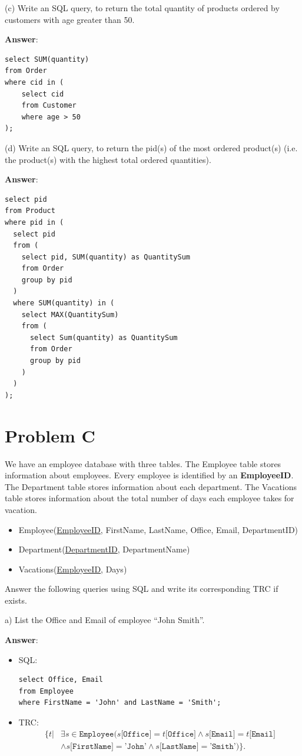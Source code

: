 \documentclass{article}
\begin{document}
(c) Write an SQL query, to return the total quantity of products ordered by customers with age greater than 50.

{\bf Answer}:
\begin{verbatim}
select SUM(quantity)
from Order
where cid in (
    select cid
    from Customer
    where age > 50
);
\end{verbatim}

(d) Write an SQL query, to return the pid(s) of the most ordered product(s) (i.e. the product(s) with the highest total ordered quantities).

{\bf Answer}: 
\begin{verbatim}
select pid
from Product
where pid in (
  select pid
  from (
    select pid, SUM(quantity) as QuantitySum
    from Order
    group by pid
  )
  where SUM(quantity) in (
    select MAX(QuantitySum)
    from (
      select Sum(quantity) as QuantitySum
      from Order
      group by pid
    )
  )
);
\end{verbatim}

\section{Problem C}
We have an employee database with three tables. The Employee table stores information about employees. Every employee is identified by an {\bf EmployeeID}. The Department table stores information about each department. The Vacations table stores information about the total number of days each employee takes for vacation.
\begin{itemize}
\item Employee(\underline{EmployeeID}, FirstName, LastName, Office, Email, DepartmentID)
\item Department(\underline{DepartmentID}, DepartmentName)
\item Vacations(\underline{EmployeeID}, Days)
\end{itemize}

Answer the following queries using SQL and write its corresponding TRC if exists.

a) List the Office and Email of employee ``John Smith''.

{\bf Answer}: 
\begin{itemize}
\item SQL:
\begin{verbatim}
select Office, Email
from Employee
where FirstName = 'John' and LastName = 'Smith';
\end{verbatim}

\item TRC:
$$\begin{aligned}
\{t | &\exists s \in \texttt{Employee} (s\texttt{[Office]} = t\texttt{[Office]} \wedge s\texttt{[Email]} = t\texttt{[Email]} \\
&\wedge s\texttt{[FirstName]} = \texttt{'John'} \wedge s\texttt{[LastName]} = \texttt{'Smith'})\}.
\end{aligned}$$
\end{itemize}
\end{document}
